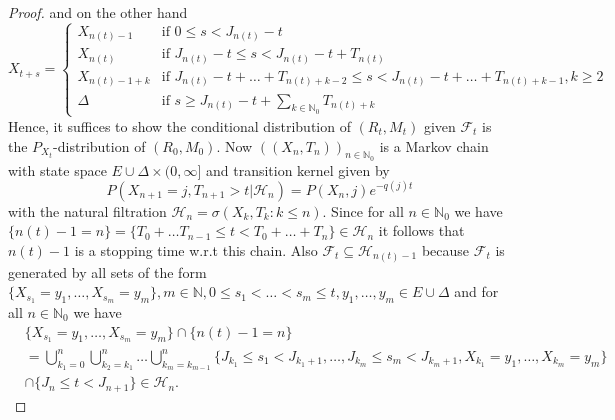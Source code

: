 \documentclass[12pt,a4paper]{scrartcl}
\numberwithin{equation}{section}
\newcommand{\N}{\mathbb{N}} %
\begin{document}
\begin{proof}
and on the other hand
$$X_{t+s} = \begin{cases} X_{n\left(t\right) - 1} &\mbox{if } 0 \leq s < J_{n\left(t\right)} - t \\ 
X_{n\left(t\right)} &\mbox{if } J_{n\left(t\right)} - t \leq s <  J_{n\left(t\right)} - t + T_{n\left(t\right)} \\
X_{n\left(t\right)-1 + k} &\mbox{if } J_{n\left(t\right)} - t + \ldots + T_{n\left(t\right) + k -2} \leq s <  J_{n\left(t\right)} - t + \ldots + T_{n\left(t\right) + k -1} , k \geq 2 \\
\Delta &\mbox{if } s \geq  J_{n\left(t\right)} - t + \sum_{k \in \N_0} T_{n\left(t\right) + k} \end{cases} $$
Hence, it suffices to show the conditional distribution of $\left(R_t, M_t \right)$ given $\mathcal{F}_t$ is the $P_{X_t}$-distribution of $\left(R_0, M_0\right)$. Now $\left(\left(X_n, T_n\right) \right)_{n \in \N_0}$ is a Markov chain with state space $ E \cup \Delta \times (0, \infty]$ and transition kernel given by
$$ P\left(X_{n+1} = j, T_{n+1} > t | \mathcal{H}_n \right) = P\left(X_n, j \right) e^{-q\left(j\right) t}$$
with the natural filtration $\mathcal{H}_n = \sigma\left(X_k, T_k : k \leq n \right)$. 
Since for all $n \in \N_0$ we have $\lbrace n\left(t\right) - 1 = n \rbrace = \lbrace T_0 + \ldots T_{n-1} \leq t < T_0 + \ldots + T_n\rbrace \in \mathcal{H}_n $ it follows that $n\left(t\right) - 1$ is a stopping time w.r.t this chain. Also $\mathcal{F}_t \subseteq \mathcal{H}_{n\left(t\right) - 1} $ because $ \mathcal{F}_t$ is generated by all sets of the form $\lbrace X_{s_1} = y_1, \ldots , X_{s_m} = y_m \rbrace , m \in \N, 0 \leq s_1 < \ldots < s_m \leq t, y_1, \ldots, y_m \in E \cup \Delta$ and for all $n \in \N_0$ we have
\begin{align*}
&\lbrace X_{s_1} = y_1, \ldots , X_{s_m} = y_m \rbrace  \cap \lbrace n\left(t\right) - 1 = n \rbrace \\
&= \bigcup_{k_1 = 0}^n \bigcup_{k_2 = k_1}^n \ldots \bigcup_{k_m = k_{m-1}}^n \lbrace J_{k_1} \leq s_1 < J_{k_1 + 1}, \ldots, J_{k_m} \leq s_m < J_{k_m + 1}, X_{k_1} = y_1, \ldots , X_{k_m} = y_m \rbrace \\
&\cap \lbrace J_n \leq t < J_{n+1} \rbrace \in \mathcal{H}_n.
\end{align*}


\end{proof}
\end{document}
